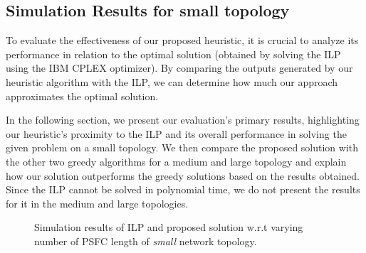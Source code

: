 \documentclass[journal]{IEEEtran}
\begin{document}

\subsection{Simulation Results for small topology}
To evaluate the effectiveness of our proposed heuristic, it is crucial to analyze its performance in relation to the optimal solution (obtained by solving the ILP using the IBM CPLEX optimizer). By comparing the outputs generated by our heuristic algorithm with the ILP, we can determine how much our approach approximates the optimal solution.

In the following section, we present our evaluation's primary results, highlighting our heuristic's proximity to the ILP and its overall performance in solving the given problem on a small topology.
We then compare the proposed solution with the other two greedy algorithms for a medium and large topology and explain how our solution outperforms the greedy solutions based on the results obtained. Since the ILP cannot be solved in polynomial time, we do not present the results for it in the medium and large topologies. \\

\begin{figure*}[t]
\centering
{}
{}
     \newline
    \newline
   \newline
    \centering
    \vspace{0.6cm}
  \caption{Simulation results of ILP and proposed solution w.r.t varying number of PSFC length of \emph{small} network topology.}
\label{fig:psfc_req}
\end{figure*}
\end{document}
